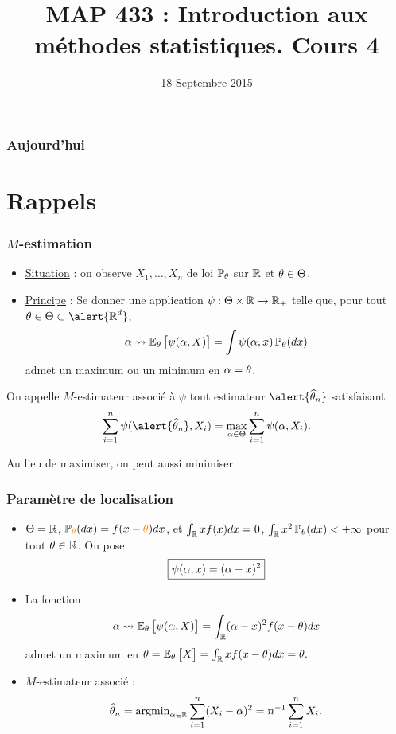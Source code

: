 
\title{MAP 433 : Introduction aux méthodes statistiques. Cours 4}

\date{18 Septembre 2015}
\maketitle



\begin{frame}
\frametitle{Aujourd'hui}
\tableofcontents
\end{frame}


\section{Rappels}

\begin{frame}
\frametitle{$M$-estimation}
\begin{itemize}
\item \underline{Situation} : on observe $X_1,\ldots, X_n$ de loi $\operatorname{{\mathbb P}}_{\theta}$ sur $\operatorname{{\mathbb R}}$ et $\theta \in \Theta$.
\item \underline{Principe} : Se donner une application $\psi : \Theta \times \operatorname{{\mathbb R}} \rightarrow \operatorname{{\mathbb R}}_+$ telle que, pour tout $\truetheta \in \Theta \subset \alert{\R^d}$,
$$\alpha \leadsto \operatorname{{\mathbb E}}_\theta\big[\psi(\alpha,X)\big] = \int \psi(\alpha,x)\operatorname{{\mathbb P}}_\theta(dx)$$
admet \alert{un maximum} ou un \alert{minimum} en $\alpha=\theta$.
\end{itemize}
\begin{df}
On appelle $M$-estimateur associé à $\psi$ tout estimateur $\alert{\est}$ satisfaisant
$$\sum_{i = 1}^n \psi(\alert{\est}, X_i) = \max_{\curtheta \in \Theta}\sum_{i = 1}^n\psi(\curtheta, X_i).$$
\end{df}
{\tiny Au lieu de maximiser, on peut aussi minimiser}
\end{frame}

\begin{frame}
\frametitle{Paramètre de localisation}
\begin{itemize}
\item $\Theta = \operatorname{{\mathbb R}}$, $\PP_{\tco{\truetheta}}(dx) = f(x-{\tco{\truetheta}})dx$, et $\int_{\operatorname{{\mathbb R}}}xf(x)dx=0$, $\int_{\operatorname{{\mathbb R}}}x^2\operatorname{{\mathbb P}}_\theta(dx)<+\infty$ pour tout $\theta \in \operatorname{{\mathbb R}}$. On pose
$$\boxed{\psi(\alpha,x)=(\alpha-x)^2}$$
\item La fonction
$$\alpha \leadsto \operatorname{{\mathbb E}}_\theta\big[\psi(\alpha,X)\big] =
\int_{\operatorname{{\mathbb R}}}(\alpha-x)^2f(x-\theta)dx$$
admet un \alert{maximum} en $\theta=\operatorname{{\mathbb E}}_\theta\big[X\big] = \int_{\operatorname{{\mathbb R}}}xf(x-\theta)dx=\theta.$
\item \alert{$M$-estimateur associé :}
$$\operatorname{\widehat \theta_{\mathnormal{n}}} = \mathrm{argmin}_{\alpha \in \operatorname{{\mathbb R}}}\sum_{i = 1}^n (X_i-\alpha)^2= n^{-1} \sum_{i=1}^n X_i.$$
\end{itemize}
\end{frame}

